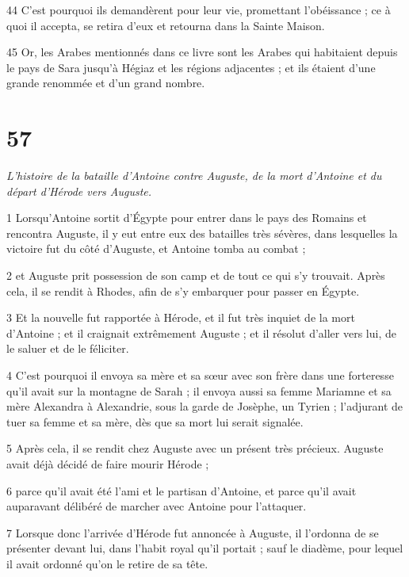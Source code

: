 \par 44 C'est pourquoi ils demandèrent pour leur vie, promettant l'obéissance ; ce à quoi il accepta, se retira d'eux et retourna dans la Sainte Maison.

\par 45 Or, les Arabes mentionnés dans ce livre sont les Arabes qui habitaient depuis le pays de Sara jusqu'à Hégiaz et les régions adjacentes ; et ils étaient d'une grande renommée et d'un grand nombre.


\chapter{57}

\par \textit{L'histoire de la bataille d'Antoine contre Auguste, de la mort d'Antoine et du départ d'Hérode vers Auguste.}

\par 1 Lorsqu'Antoine sortit d'Égypte pour entrer dans le pays des Romains et rencontra Auguste, il y eut entre eux des batailles très sévères, dans lesquelles la victoire fut du côté d'Auguste, et Antoine tomba au combat ;

\par 2 et Auguste prit possession de son camp et de tout ce qui s'y trouvait. Après cela, il se rendit à Rhodes, afin de s'y embarquer pour passer en Égypte.

\par 3 Et la nouvelle fut rapportée à Hérode, et il fut très inquiet de la mort d'Antoine ; et il craignait extrêmement Auguste ; et il résolut d'aller vers lui, de le saluer et de le féliciter.

\par 4 C'est pourquoi il envoya sa mère et sa sœur avec son frère dans une forteresse qu'il avait sur la montagne de Sarah ; il envoya aussi sa femme Mariamne et sa mère Alexandra à Alexandrie, sous la garde de Josèphe, un Tyrien ; l'adjurant de tuer sa femme et sa mère, dès que sa mort lui serait signalée.

\par 5 Après cela, il se rendit chez Auguste avec un présent très précieux. Auguste avait déjà décidé de faire mourir Hérode ;

\par 6 parce qu'il avait été l'ami et le partisan d'Antoine, et parce qu'il avait auparavant délibéré de marcher avec Antoine pour l'attaquer.

\par 7 Lorsque donc l'arrivée d'Hérode fut annoncée à Auguste, il l'ordonna de se présenter devant lui, dans l'habit royal qu'il portait ; sauf le diadème, pour lequel il avait ordonné qu'on le retire de sa tête.

